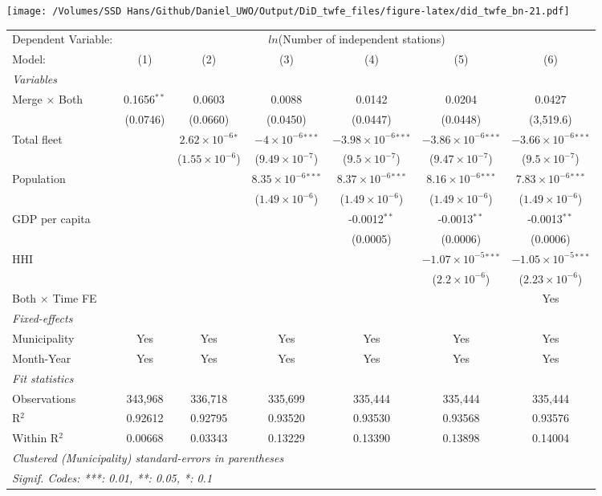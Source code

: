 \documentclass[
]{article}
\begin{document}
\texttt{[image: /Volumes/SSD Hans/Github/Daniel\_UWO/Output/DiD\_twfe\_files/figure-latex/did\_twfe\_bn-21.pdf]}

\begin{tabular}{lcccccc}
\tabularnewline\midrule\midrule
Dependent Variable:&\multicolumn{6}{c}{$ln$(Number of independent stations)}\\
Model:&(1) & (2) & (3) & (4) & (5) & (6)\\
\midrule \emph{Variables}&   &   &   &   &   &  \\
Merge $\times $ Both & 0.1656$^{**}$ & 0.0603 & 0.0088 & 0.0142 & 0.0204 & 0.0427\\
  &(0.0746) & (0.0660) & (0.0450) & (0.0447) & (0.0448) & (3,519.6)\\
Total fleet &    & $2.62\times 10^{-6}$$^{*}$ & $-4\times 10^{-6}$$^{***}$ & $-3.98\times 10^{-6}$$^{***}$ & $-3.86\times 10^{-6}$$^{***}$ & $-3.66\times 10^{-6}$$^{***}$\\
  &   & ($1.55\times 10^{-6}$) & ($9.49\times 10^{-7}$) & ($9.5\times 10^{-7}$) & ($9.47\times 10^{-7}$) & ($9.5\times 10^{-7}$)\\
Population &    &    & $8.35\times 10^{-6}$$^{***}$ & $8.37\times 10^{-6}$$^{***}$ & $8.16\times 10^{-6}$$^{***}$ & $7.83\times 10^{-6}$$^{***}$\\
  &   &    & ($1.49\times 10^{-6}$) & ($1.49\times 10^{-6}$) & ($1.49\times 10^{-6}$) & ($1.49\times 10^{-6}$)\\
GDP per capita &    &    &    & -0.0012$^{**}$ & -0.0013$^{**}$ & -0.0013$^{**}$\\
  &   &    &    & (0.0005) & (0.0006) & (0.0006)\\
HHI &    &    &    &    & $-1.07\times 10^{-5}$$^{***}$ & $-1.05\times 10^{-5}$$^{***}$\\
  &   &    &    &    & ($2.2\times 10^{-6}$) & ($2.23\times 10^{-6}$)\\
Both $\times$ Time FE &  &  &  &  &  & Yes\\
\midrule \emph{Fixed-effects}&   &   &   &   &   &  \\
Municipality & Yes & Yes & Yes & Yes & Yes & Yes\\
Month-Year & Yes & Yes & Yes & Yes & Yes & Yes\\
\midrule \emph{Fit statistics}&  & & & & & \\
Observations & 343,968&336,718&335,699&335,444&335,444&335,444\\
R$^2$ & 0.92612&0.92795&0.93520&0.93530&0.93568&0.93576\\
Within R$^2$ & 0.00668&0.03343&0.13229&0.13390&0.13898&0.14004\\
\midrule\midrule\multicolumn{7}{l}{\emph{Clustered (Municipality) standard-errors in parentheses}}\\
\multicolumn{7}{l}{\emph{Signif. Codes: ***: 0.01, **: 0.05, *: 0.1}}\\
\end{tabular}
\end{document}
